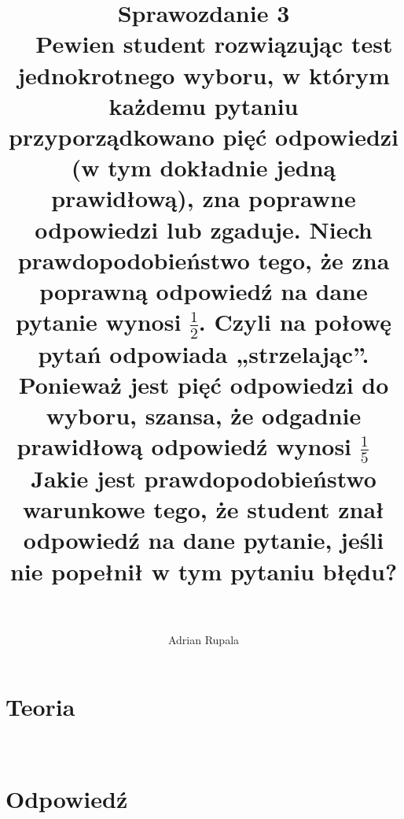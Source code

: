 \documentclass[UTF8]{article}
\title{%
	Sprawozdanie 3 \\~
	\large\flushleft Pewien student rozwiązując test jednokrotnego wyboru, w którym każdemu pytaniu przyporządkowano pięć odpowiedzi (w tym dokładnie jedną prawidłową), zna poprawne odpowiedzi lub zgaduje. Niech prawdopodobieństwo tego, że zna poprawną odpowiedź na dane pytanie wynosi $\frac{1}{2}$. Czyli na połowę pytań odpowiada „strzelając”. Ponieważ jest pięć odpowiedzi do wyboru, szansa, że odgadnie prawidłową odpowiedź wynosi $\frac{1}{5}$ ~ \bigskip
	\\Jakie jest prawdopodobieństwo warunkowe tego, że student znał odpowiedź na dane pytanie, jeśli nie popełnił w tym pytaniu błędu? ~}
\author{Adrian Rupala}
\begin{document}
\maketitle

\newpage
\tableofcontents

\newpage
{}

\section{Teoria} ~

\newpage

\section{Odpowiedź} ~

\newpage
\end{document}
